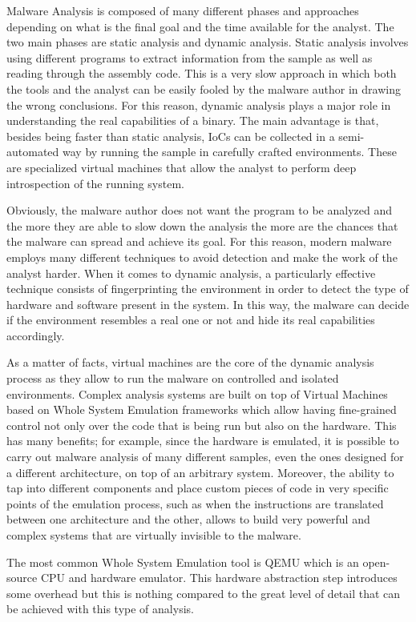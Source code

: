 Malware Analysis is composed of many different phases and approaches depending on what is the final goal and the time available for the analyst. The two main phases are static analysis and dynamic analysis. Static analysis involves using different programs to extract information from the sample as well as reading through the assembly code. This is a very slow approach in which both the tools and the analyst can be easily fooled by the malware author in drawing the wrong conclusions. For this reason, dynamic analysis plays a major role in understanding the real capabilities of a binary. The main advantage is that, besides being faster than static analysis, IoCs can be collected in a semi-automated way by running the sample in carefully crafted environments. These are specialized virtual machines that allow the analyst to perform deep introspection of the running system.

Obviously, the malware author does not want the program to be analyzed and the more they are able to slow down the analysis the more are the chances that the malware can spread and achieve its goal. For this reason, modern malware employs many different techniques to avoid detection and make the work of the analyst harder. When it comes to dynamic analysis, a particularly effective technique consists of fingerprinting the environment in order to detect the type of hardware and software present in the system. In this way, the malware can decide if the environment resembles a real one or not and hide its real capabilities accordingly.

As a matter of facts, virtual machines are the core of the dynamic analysis process as they allow to run the malware on controlled and isolated environments. Complex analysis systems are built on top of Virtual Machines based on Whole System Emulation frameworks which allow having fine-grained control not only over the code that is being run but also on the hardware. This has many benefits; for example, since the hardware is emulated, it is possible to carry out malware analysis of many different samples, even the ones designed for a different architecture, on top of an arbitrary system. Moreover, the ability to tap into different components and place custom pieces of code in very specific points of the emulation process, such as when the instructions are translated between one architecture and the other, allows to build very powerful and complex systems that are virtually invisible to the malware.

The most common Whole System Emulation tool is QEMU which is an open-source CPU and hardware emulator. This hardware abstraction step introduces some overhead but this is nothing compared to the great level of detail that can be achieved with this type of analysis. 

